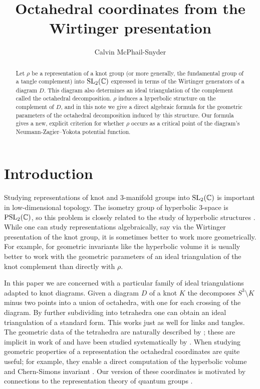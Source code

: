 \documentclass[leqno]{sl2art}
\title{Octahedral coordinates from the Wirtinger presentation}
\author{Calvin McPhail-Snyder}
\begin{document}
%
%
%
%

\begin{abstract}
  Let \(\rho\) be a representation of a knot group (or more generally, the fundamental group of a tangle complement) into \(\operatorname{SL}_2(\mathbb{C})\) expressed in terms of the Wirtinger generators of a diagram \(D\).
  This diagram also determines an ideal triangulation of the complement called the octahedral decomposition.
  \(\rho\) induces a hyperbolic structure on the complement of \(D\), and in this note we give a direct algebraic formula for the geometric parameters of the octahedral decomposition induced by this structure.
  Our formula gives a new, explicit criterion for whether \(\rho\) occurs as a critical point of the diagram's Neumann-Zagier--Yokota potential function.
\end{abstract}


\maketitle

\tableofcontents

\section{Introduction}

Studying representations of knot and \(3\)-manifold groups into \(\operatorname{SL}_2(\mathbb{C})\) is important in low-dimensional topology.
The isometry group of hyperbolic \(3\)-space is \(\operatorname{PSL}_2(\mathbb{C})\), so this problem is closely related to the study of hyperbolic structures \cite{ThurstonNotes}.
While one can study representations algebraically, say via the Wirtinger presentation of the knot group, it is sometimes better to work more geometrically.
For example, for geometric invariants like the hyperbolic volume it is usually better to work with the geometric parameters of an ideal triangulation of the knot complement than directly with \(\rho\).

In this paper we are concerned with a particular family of ideal triangulations adapted to knot diagrams.
Given a diagram \(D\) of a knot \(K\) the  decomposes \(S^3 \setminus K\) minus two points into a union of octahedra, with one for each crossing of the diagram.
By further subdividing into tetrahedra one can obtain an ideal triangulation of a standard form.
This works just as well for links and tangles.
The geometric data of the tetrahedra are naturally described by ; these are implicit in work of \citeauthor{Yokota2000} \cite{Yokota2000} and have been studied systematically by \citeauthor{Kim2016} \cite{Kim2016,Kim2018}.
When studying geometric properties of a representation the octahedral coordinates are quite useful; for example, they enable a direct computation of the hyperbolic volume and Chern-Simons invariant \cite{Cho2013}.
Our version of these coordinates is motivated by connections to the representation theory of quantum groups \cite{McPhailSnyder2022,McPhailSnyderAlgebra}.
\end{document}
